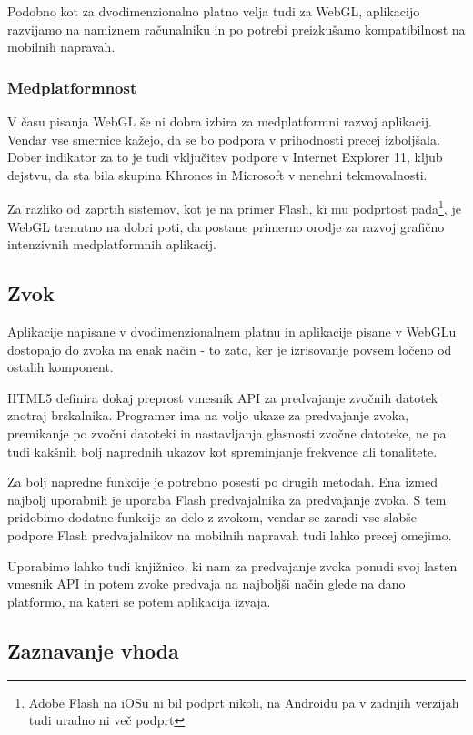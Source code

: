 Podobno kot za dvodimenzionalno platno velja tudi za WebGL, aplikacijo razvijamo na namiznem računalniku in po potrebi preizkušamo kompatibilnost na mobilnih napravah.

\subsubsection{Medplatformnost}

V času pisanja WebGL še ni dobra izbira za medplatformni razvoj aplikacij. Vendar vse smernice kažejo, da se bo podpora v prihodnosti precej izboljšala. Dober indikator za to je tudi vključitev podpore v Internet Explorer 11, kljub dejstvu, da sta bila skupina Khronos in Microsoft v nenehni tekmovalnosti.

Za razliko od zaprtih sistemov, kot je na primer Flash, ki mu podprtost pada\footnote{Adobe Flash na iOSu ni bil podprt nikoli, na Androidu pa v zadnjih verzijah tudi uradno ni več podprt}, je WebGL trenutno na dobri poti, da postane primerno orodje za razvoj grafično intenzivnih medplatformnih aplikacij.

\subsection{Zvok}

Aplikacije napisane v dvodimenzionalnem platnu in aplikacije pisane v WebGLu dostopajo do zvoka na enak način - to zato, ker je izrisovanje povsem ločeno od ostalih komponent.

HTML5 definira dokaj preprost vmesnik API za predvajanje zvočnih datotek znotraj brskalnika. Programer ima na voljo ukaze za predvajanje zvoka, premikanje po zvočni datoteki in nastavljanja glasnosti zvočne datoteke, ne pa tudi kakšnih bolj naprednih ukazov kot spreminjanje frekvence ali tonalitete.

Za bolj napredne funkcije je potrebno posesti po drugih metodah. Ena izmed najbolj uporabnih je uporaba Flash predvajalnika za predvajanje zvoka. S tem pridobimo dodatne funkcije za delo z zvokom, vendar se zaradi vse slabše podpore Flash predvajalnikov na mobilnih napravah tudi lahko precej omejimo. 

Uporabimo lahko tudi knjižnico, ki nam za predvajanje zvoka ponudi svoj lasten vmesnik API in potem zvoke predvaja na najboljši način glede na dano platformo, na kateri se potem aplikacija izvaja.

\subsection{Zaznavanje vhoda}

